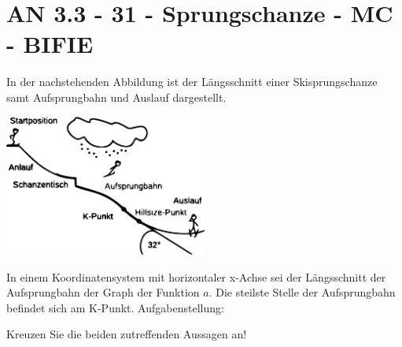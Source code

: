 \section{AN 3.3 - 31 - Sprungschanze - MC - BIFIE}

\begin{beispiel}[AN 3.3]{1} %
In der nachstehenden Abbildung ist der Längsschnitt einer Skisprungschanze samt Aufsprungbahn und Auslauf dargestellt. 

\begin{center}
\includegraphics[width=0.5\textwidth]{../_database/Bilder/GrafikAN3331.eps}
\end{center}

In einem Koordinatensystem mit horizontaler x-Achse sei der Längsschnitt der Aufsprungbahn der Graph der Funktion $a$. Die steilste Stelle der Aufsprungbahn befindet sich am K-Punkt.
Aufgabenstellung:

Kreuzen Sie die beiden zutreffenden Aussagen an! 

				
\end{beispiel}